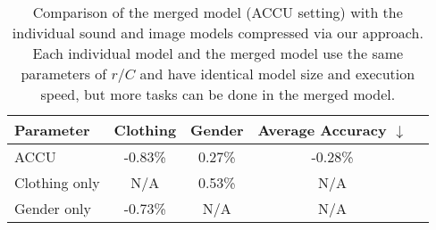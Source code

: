 \documentclass{article}
\begin{document}
	
	\begin{table}[pt]
		\small
		\centering
		\caption{Comparison of the merged model (ACCU setting) with the individual sound and image models compressed via our approach. Each individual model and the merged model use the same parameters of $r/C$ and have identical model size and execution speed, but more tasks can be done in the merged model.}
		\label{Ex2MergeOrSingle}
		\begin{tabular}{lcccc}
			\toprule
			Parameter            & Clothing  & Gender  & Average Accuracy $\downarrow$    \\ \hline
			ACCU                &  -0.83\%           & 0.27\%     & -0.28\%             \\ \hline
			Clothing only           & N/A              & 0.53\%         & N/A                          \\     
			Gender only           & -0.73\%           & N/A              & N/A                          \\
			\bottomrule
		\end{tabular}
	\end{table}
	
\end{document}
